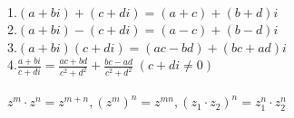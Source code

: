 \begin{minipage}[b][14cm][t]{\textwidth}
\begin{tabularx}{\textwidth}{lX}
\end{tabularx}
\begin{Large}
  \begin{center}\color{blue}\color{black}\end{center}
   \\
  1.$(a+bi)+(c+di)=(a+c)+(b+d)i$ \\
  2.$(a+bi)-(c+di)=(a-c)+(b-d)i$ \\
  3.$(a+bi)(c+di)=(ac-bd)+(bc+ad)i$ \\
  4.$\frac{a+bi}{c+di}=\frac{ac+bd}{c^2+d^2} + \frac{bc-ad}{c^2+d^2} \hspace{3pt} (c+di \ne 0)$ \\[10pt]
   \\
  $z^m \cdot z^n=z^{m+n},(z^m)^n=z^{mn},(z_1 \cdot z_2)^n=z_1^n \cdot z_2^n$
\end{Large}
\end{minipage}
